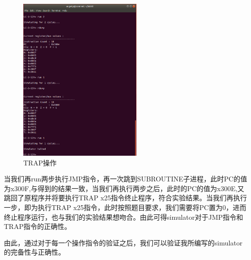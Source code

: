 \documentclass[runningheads]{llncs}
\begin{document}
\vspace{-1.2cm}
\begin{figure}[H]
    \centering
    \includegraphics[width=0.55\textwidth]{11.png}
    \caption{TRAP操作}
    \label{fig:3-11}
\end{figure}
当我们再run两步执行JMP指令，再一次跳到SUBROUTINE子进程，此时PC的值为x300F,与得到的结果一致，当我们再执行两步之后，此时的PC的值为x300E,又跳回了原程序并将要执行TRAP x25指令终止程序，符合实验结果。当我们再执行一步，即为执行TRAP x25指令，此时按照题目要求，我们需要将PC置为0，进而终止程序运行，也与我们的实验结果想吻合。由此可得simulator对于JMP指令和TRAP指令的正确性。

由此，通过对于每一个操作指令的验证之后，我们可以验证我所编写的simulator的完备性与正确性。


\end{document}
